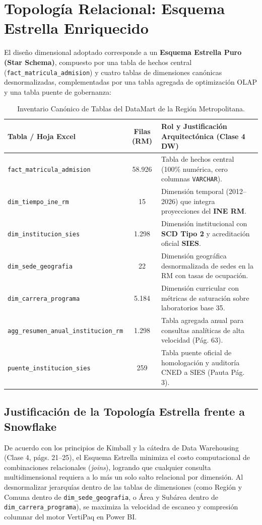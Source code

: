 \documentclass[11pt,a4paper]{article}
\begin{document}
\section{Topología Relacional: Esquema Estrella Enriquecido}

El diseño dimensional adoptado corresponde a un \textbf{Esquema Estrella Puro (Star Schema)}, compuesto por una tabla de hechos central (\texttt{fact\_matricula\_admision}) y cuatro tablas de dimensiones canónicas desnormalizadas, complementadas por una tabla agregada de optimización OLAP y una tabla puente de gobernanza:

\begin{table}[h!]
\centering
\small
\begin{tabularx}{\linewidth}{l c X}
\toprule
\textbf{Tabla / Hoja Excel} & \textbf{Filas (RM)} & \textbf{Rol y Justificación Arquitectónica (Clase 4 DW)} \\
\midrule
\texttt{fact\_matricula\_admision} & 58.926 & Tabla de hechos central (100\% numérica, cero columnas \texttt{VARCHAR}). \\
\texttt{dim\_tiempo\_ine\_rm} & 15 & Dimensión temporal (2012--2026) que integra proyecciones del \textbf{INE RM}. \\
\texttt{dim\_institucion\_sies} & 1.298 & Dimensión institucional con \textbf{SCD Tipo 2} y acreditación oficial \textbf{SIES}. \\
\texttt{dim\_sede_geografia} & 22 & Dimensión geográfica desnormalizada de sedes en la RM con tasas de ocupación. \\
\texttt{dim\_carrera\_programa} & 5.184 & Dimensión curricular con métricas de saturación sobre laboratorios base 35. \\
\texttt{agg\_resumen\_anual\_institucion\_rm} & 1.298 & Tabla agregada anual para consultas analíticas de alta velocidad (Pág. 63). \\
\texttt{puente\_institucion_sies} & 259 & Tabla puente oficial de homologación y auditoría CNED a SIES (Pauta Pág. 3). \\
\bottomrule
\end{tabularx}
\caption{Inventario Canónico de Tablas del DataMart de la Región Metropolitana.}
\end{table}

\subsection{Justificación de la Topología Estrella frente a Snowflake}
De acuerdo con los principios de Kimball y la cátedra de Data Warehousing (Clase 4, págs. 21--25), el Esquema Estrella minimiza el costo computacional de combinaciones relacionales (\emph{joins}), logrando que cualquier consulta multidimensional requiera a lo más un solo salto relacional por dimensión. Al desnormalizar jerarquías dentro de las tablas de dimensiones (como Región y Comuna dentro de \texttt{dim\_sede\_geografia}, o Área y Subárea dentro de \texttt{dim\_carrera\_programa}), se maximiza la velocidad de escaneo y compresión columnar del motor VertiPaq en Power BI.
\end{document}
